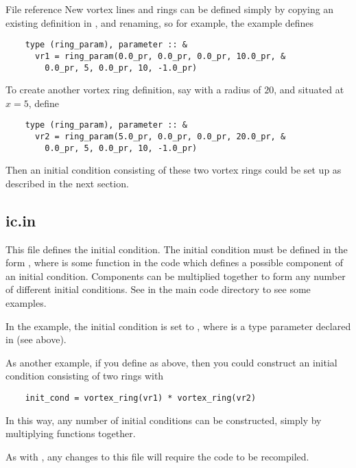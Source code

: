 \begin{chapter}{\label{cha:file_reference}File reference}
  New vortex lines and rings can be defined simply by copying an existing
  definition in , and renaming, so for example, the
   example defines
  \begin{Verbatim}
    type (ring_param), parameter :: &
      vr1 = ring_param(0.0_pr, 0.0_pr, 0.0_pr, 10.0_pr, &
        0.0_pr, 5, 0.0_pr, 10, -1.0_pr)
  \end{Verbatim}
  To create another vortex ring definition, say with a radius of $20$, and
  situated at $x=5$, define
  \begin{Verbatim}
    type (ring_param), parameter :: &
      vr2 = ring_param(5.0_pr, 0.0_pr, 0.0_pr, 20.0_pr, &
        0.0_pr, 5, 0.0_pr, 10, -1.0_pr)
  \end{Verbatim}
  Then an initial condition consisting of these two vortex rings could be set
  up as described in the next section. 

  \subsection{\label{subsec:ic.in}ic.in}
  This file defines the initial condition.  The initial condition must be
  defined in the form , where
   is some function in the code which defines a possible
  component of an initial condition.  Components can be multiplied together to
  form any number of different initial conditions.  See  in the
  main code directory to see some examples.

  In the  example, the initial condition is set to
  , where  is a type parameter declared
  in  (see above).

  As another example, if you define  as above, then you could
  construct an initial condition consisting of two rings with
  \begin{Verbatim}
    init_cond = vortex_ring(vr1) * vortex_ring(vr2)
  \end{Verbatim}
  In this way, any number of initial conditions can be constructed, simply by
  multiplying functions together.

  As with , any changes to this file will require the
  code to be recompiled.


\end{chapter}
